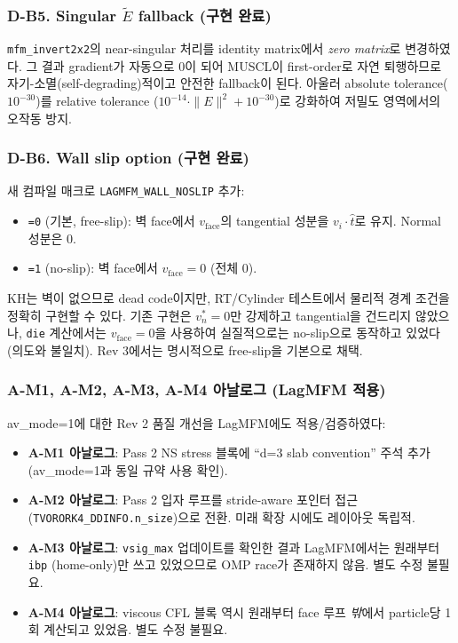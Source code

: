 \documentclass[11pt]{article}
\begin{document}
\subsubsection*{D-B5. Singular $\tilde E$ fallback (구현 완료)}
\texttt{mfm\_invert2x2}의 near-singular 처리를 identity matrix에서 \emph{zero matrix}로
변경하였다. 그 결과 gradient가 자동으로 0이 되어 MUSCL이 first-order로 자연
퇴행하므로 자기-소멸(self-degrading)적이고 안전한 fallback이 된다. 아울러
absolute tolerance($10^{-30}$)를 relative tolerance
($10^{-14}\cdot\|E\|^2 + 10^{-30}$)로 강화하여 저밀도 영역에서의 오작동 방지.

\subsubsection*{D-B6. Wall slip option (구현 완료)}
새 컴파일 매크로 \texttt{LAGMFM\_WALL\_NOSLIP} 추가:
\begin{itemize}
 \item \texttt{=0} (기본, free-slip): 벽 face에서 $v_\mathrm{face}$의 tangential
       성분을 $v_i\cdot\hat t$로 유지. Normal 성분은 0.
 \item \texttt{=1} (no-slip): 벽 face에서 $v_\mathrm{face} = 0$ (전체 0).
\end{itemize}
KH는 벽이 없으므로 dead code이지만, RT/Cylinder 테스트에서 물리적 경계
조건을 정확히 구현할 수 있다. 기존 구현은 $v_n^*=0$만 강제하고 tangential을
건드리지 않았으나, \texttt{die} 계산에서는 $v_\mathrm{face}=0$을 사용하여
실질적으로는 no-slip으로 동작하고 있었다 (의도와 불일치). Rev 3에서는
명시적으로 free-slip을 기본으로 채택.

\subsubsection*{A-M1, A-M2, A-M3, A-M4 아날로그 (LagMFM 적용)}
av\_mode=1에 대한 Rev 2 품질 개선을 LagMFM에도 적용/검증하였다:
\begin{itemize}
 \item \textbf{A-M1 아날로그}: Pass 2 NS stress 블록에 ``d=3 slab
       convention'' 주석 추가 (av\_mode=1과 동일 규약 사용 확인).
 \item \textbf{A-M2 아날로그}: Pass 2 입자 루프를 stride-aware 포인터
       접근 (\texttt{TVORORK4\_DDINFO.n\_size})으로 전환. 미래 확장 시에도
       레이아웃 독립적.
 \item \textbf{A-M3 아날로그}: \texttt{vsig\_max} 업데이트를 확인한 결과
       LagMFM에서는 원래부터 \texttt{ibp} (home-only)만 쓰고 있었으므로
       OMP race가 존재하지 않음. 별도 수정 불필요.
 \item \textbf{A-M4 아날로그}: viscous CFL 블록 역시 원래부터 face 루프
       \emph{밖}에서 particle당 1회 계산되고 있었음. 별도 수정 불필요.
\end{itemize}
\end{document}
